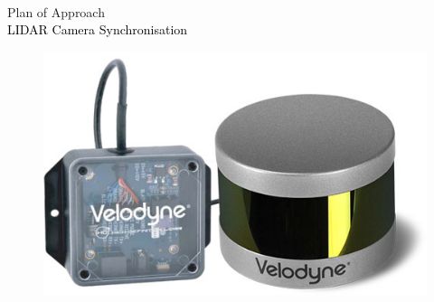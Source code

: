 \begin{titlepage}

 \pagecolor{hague-limegreen}
    
    
    \newcommand{\kantlinebreedte}{1cm}
    \newcommand{\dedatum}{\today}
    \newcommand{\detitel}{Plan of Approach}
    \newcommand{\desubtitel}{LIDAR Camera Synchronisation}
    
    \begin{flushleft}
        \huge 
        \hspace{0,9 cm} \\ 
        \hspace{0,9cm} {\fontsize{50}{60}\selectfont\detitel\\}
        \hspace{\kantlinebreedte}
        \textcolor{black}{\desubtitel\\}
        
        \vspace{1cm}
        
        \begin{figure}[h]
        \centering
        \includegraphics[width=\textwidth]{cover/image_lidar.png}
       
        \end{figure}
        
        \vspace{0.6cm}
        

\end{flushleft}
\end{titlepage}
